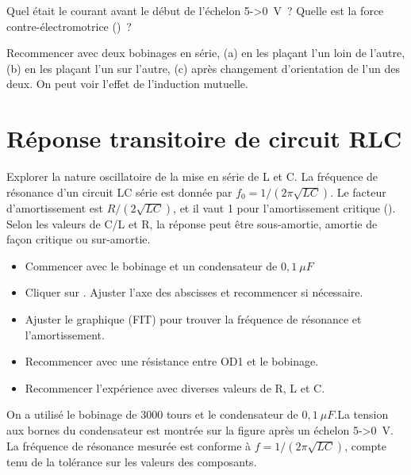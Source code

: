 \documentclass[a4paper,12pt,french]{sphinxmanual}
\let\sphinxpxdimen\pdfpxdimen\else\newdimen\sphinxpxdimen
\begin{document}
Quel était le courant avant le début de l’échelon 5-\textgreater{}0 V ? Quelle est la
force contre-électromotrice () ?

Recommencer avec deux bobinages en série, (a) en les plaçant l’un loin
de l’autre, (b) en les plaçant l’un sur l’autre, (c) après changement
d’orientation de l’un des deux. On peut voir l’effet de l’induction
mutuelle.


\section{Réponse transitoire de circuit RLC}
\label{\detokenize{4.4:reponse-transitoire-de-circuit-rlc}}\label{\detokenize{4.4::doc}}

Explorer la nature oscillatoire de la mise en série de L et C. La
fréquence de résonance d’un circuit LC série est donnée par
\(f_0 = 1/(2\pi\sqrt{LC})\). Le facteur d’amortissement
est \(R/(2\sqrt{LC})\), et il vaut 1 pour
l’amortissement
critique (). Selon les
valeurs de C/L et R, la réponse peut être sous-amortie, amortie de façon
critique ou sur-amortie.

\noindent\sphinxincludegraphics[width=300\sphinxpxdimen]{{RLCtransient}.pdf}
\noindent\sphinxincludegraphics[width=300\sphinxpxdimen]{{RLC-curves}.pdf}

\begin{itemize}
\item {} 
Commencer avec le bobinage et un condensateur de \(0,1~\mu F\)

\item {} 
Cliquer sur . Ajuster l’axe des abscisses et
recommencer si nécessaire.

\item {} 
Ajuster le graphique (FIT) pour trouver la fréquence de résonance et
l’amortissement.

\item {} 
Recommencer avec une résistance entre OD1 et le bobinage.

\item {} 
Recommencer l’expérience avec diverses valeurs de R, L et C.

\end{itemize}


On a utilisé le bobinage de 3000 tours et le condensateur de \(0,1~\mu F\).La
tension aux bornes du condensateur est montrée sur la figure après un
échelon 5-\textgreater{}0 V. La fréquence de résonance mesurée est conforme à
\(f = 1/(2\pi\sqrt{LC})\), compte tenu de la tolérance sur
les valeurs des composants.
\end{document}
